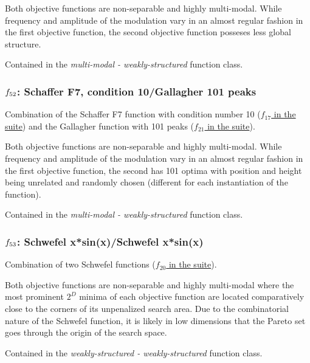 \documentclass[letterpaper,12pt,english]{article}
\begin{document}
Both objective functions are non-separable and highly multi-modal.
While frequency and amplitude of the modulation vary in an almost
regular fashion in the first objective function, the second objective
function posseses less global structure.

Contained in the \emph{multi-modal - weakly-structured} function class.


\subsubsection{\protect\(f_{52}\protect\): Schaffer F7, condition 10/Gallagher 101 peaks}
\label{index:schaffer-f7-condition-10-gallagher-101-peaks}\label{index:f52}
Combination of the Schaffer F7 function with
condition number 10 (\href{http://coco.lri.fr/downloads/download15.03/bbobdocfunctions.pdf\#page=85}{\(f_{17}\) in the  suite})
and the Gallagher function with
101 peaks (\href{http://coco.lri.fr/downloads/download15.03/bbobdocfunctions.pdf\#page=105}{\(f_{21}\) in the  suite}).

Both objective functions are non-separable and highly multi-modal.
While frequency and amplitude of the modulation vary in an almost
regular fashion in the first objective function, the second has
101 optima with position and height being unrelated and randomly
chosen (different for each instantiation of the function).

Contained in the \emph{multi-modal - weakly-structured} function class.


\subsubsection{\protect\(f_{53}\protect\): Schwefel x*sin(x)/Schwefel x*sin(x)}
\label{index:schwefel-x-sin-x-schwefel-x-sin-x}\label{index:f53}
Combination of two Schwefel functions (\href{http://coco.lri.fr/downloads/download15.03/bbobdocfunctions.pdf\#page=100}{\(f_{20}\) in the  suite}).

Both objective functions are non-separable and highly multi-modal where
the most prominent \(2^D\) minima of each objective function are
located comparatively close to the corners of its unpenalized search area.
Due to the combinatorial nature of the Schwefel function, it is likely
in low dimensions that the Pareto set goes through the origin of the
search space.

Contained in the \emph{weakly-structured - weakly-structured} function class.
\end{document}
